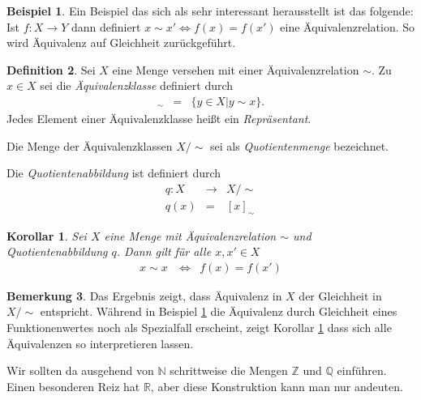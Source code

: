 \documentclass[index=totoc]{scrartcl}%
\newtheorem{cor}[thm]{Korollar}
\theoremstyle{definition}
\newtheorem{defi}{Definition}[section]
\newtheorem{bem}[defi]{Bemerkung}
\newtheorem{bsp}[defi]{Beispiel}
\newcommand{\N}{\mathbb N}
\newcommand{\Z}{\mathbb Z}
\newcommand{\Q}{\mathbb Q}
\newcommand{\R}{\mathbb R}
\begin{document}
\begin{bsp}\label{bsp:equiv1}
  Ein Beispiel das sich als sehr interessant herausstellt ist das folgende:
  Ist $f\colon X\to Y$ dann definiert $x\sim x'\iff f(x)=f(x')$
  eine Äquivalenzrelation.
  So wird Äquivalenz auf Gleichheit zurückgeführt. 
\end{bsp}

\begin{defi}
  Sei $X$ eine Menge versehen mit einer Äquivalenzrelation $\sim$.
  Zu $x\in X$ sei die {\em Äquivalenzklasse} definiert durch
  \begin{eqnarray*}
    [x]_\sim & = & \{y\in X| y\sim x\}. 
  \end{eqnarray*}
  Jedes Element einer Äquivalenzklasse heißt ein {\em Repräsentant}. 

  Die Menge der Äquivalenzklassen $X/\sim$
  sei als {\em Quotientenmenge} bezeichnet.

  Die {\em Quotientenabbildung} ist definiert durch 
  \begin{eqnarray*}
    q\colon X & \to & X/\sim \\
    q(x)      & =   & [x]_\sim
  \end{eqnarray*}
\end{defi}


\begin{cor}\label{cor:equiv1}
  Sei $X$ eine Menge mit Äquivalenzrelation $\sim$
  und Quotientenabbildung $q$.
  Dann gilt für alle $x,x'\in X$
  \begin{eqnarray*}
    x\sim x\ & \iff & f(x)=f(x')
  \end{eqnarray*}
\end{cor}

\begin{bem}
Das Ergebnis zeigt,
dass Äquivalenz in $X$ der Gleichheit in $X/\sim$ entspricht.
Während in Beispiel \ref{bsp:equiv1}
die Äquivalenz durch Gleichheit eines Funktionenwertes
noch als Spezialfall erscheint,
zeigt Korollar \ref{cor:equiv1}
dass sich alle Äquivalenzen so interpretieren lassen. 
\end{bem}



Wir sollten da ausgehend von $\N$
schrittweise die Mengen $\Z$ und $\Q$ einführen. 
Einen besonderen Reiz hat $\R$, aber diese Konstruktion kann man nur andeuten. 
\end{document}
